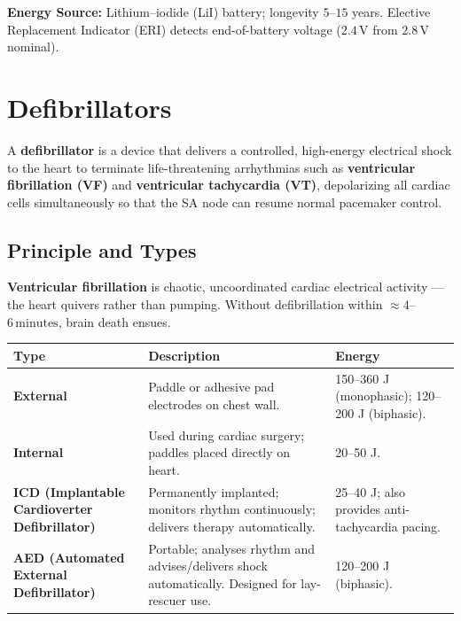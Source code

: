 \documentclass[12pt,a4paper]{article}
\begin{document}
\textbf{Energy Source:} Lithium--iodide (LiI) battery; longevity $5$--$15$ years. Elective Replacement Indicator (ERI) detects end-of-battery voltage ($2.4\,\text{V}$ from $2.8\,\text{V}$ nominal).

\section{Defibrillators}

\begin{tcolorbox}[defbox, title={\textbf{Definition: Defibrillator}}]
A \textbf{defibrillator} is a device that delivers a controlled, high-energy electrical shock to the heart to terminate life-threatening arrhythmias such as \textbf{ventricular fibrillation (VF)} and \textbf{ventricular tachycardia (VT)}, depolarizing all cardiac cells simultaneously so that the SA node can resume normal pacemaker control.
\end{tcolorbox}

\subsection{Principle and Types}

\textbf{Ventricular fibrillation} is chaotic, uncoordinated cardiac electrical activity --- the heart quivers rather than pumping. Without defibrillation within $\approx 4$--$6\,\text{minutes}$, brain death ensues.

\par\noindent
\begin{tabularx}{\linewidth}{|B{3.0cm}|Y|Y|}
\hline
\textbf{Type} & \textbf{\color{myteal}Description} & \textbf{\color{mygreen}Energy} \\
\hline
\textbf{External} & Paddle or adhesive pad electrodes on chest wall. & 150--360 J (monophasic); 120--200 J (biphasic). \\
\hline
\textbf{Internal} & Used during cardiac surgery; paddles placed directly on heart. & 20--50 J. \\
\hline
\textbf{ICD (Implantable Cardioverter Defibrillator)} & Permanently implanted; monitors rhythm continuously; delivers therapy automatically. & 25--40 J; also provides anti-tachycardia pacing. \\
\hline
\textbf{AED (Automated External Defibrillator)} & Portable; analyses rhythm and advises/delivers shock automatically. Designed for lay-rescuer use. & 120--200 J (biphasic). \\
\hline
\end{tabularx}
\end{document}
